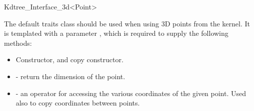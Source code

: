 \begin{ccRefClass}{Kdtree_Interface_3d<Point>}

The default traits class  
should be used when using 3D points from the {\cgal} kernel.
It is
templated with a parameter , which is required to
supply the following methods:

\begin{itemize}
    \item Constructor, and copy constructor.

    \item {} - return the dimension of the point.
    
    \item {} - an operator for accessing
    the various coordinates of the given point. Used also to copy
    coordinates between points.
\end{itemize}

\end{ccRefClass}



%
%


%



